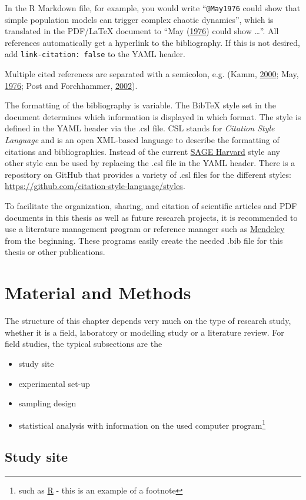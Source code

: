 \documentclass[a4paper,12pt]{article}
\providecommand{\tightlist}{%
  \setlength{\itemsep}{0pt}\setlength{\parskip}{0pt}}
\begin{document}
In the R Markdown file, for example, you would write \enquote{\texttt{@May1976} could show that simple population models can trigger complex chaotic dynamics}, which is translated in the PDF/LaTeX document to \enquote{May (\protect\hyperlink{ref-May1976}{1976}) could show \ldots{}}. All references automatically get a hyperlink to the bibliography. If this is not desired, add \texttt{link-citation:\ false} to the YAML header.

Multiple cited references are separated with a semicolon, e.g. (Kamm, \protect\hyperlink{ref-kamm2000}{2000}; May, \protect\hyperlink{ref-May1976}{1976}; Post and Forchhammer, \protect\hyperlink{ref-RN410}{2002}).

The formatting of the bibliography is variable. The BibTeX style set in the document determines which information is displayed in which format. The style is defined in the YAML header via the .csl file. CSL stands for \emph{Citation Style Language} and is an open XML-based language to describe the formatting of citations and bibliographies. Instead of the current \href{https://uk.sagepub.com/sites/default/files/sage_harvard_reference_style_0.pdf}{SAGE Harvard} style any other style can be used by replacing the .csl file in the YAML header. There is a repository on GitHub that provides a variety of .csl files for the different styles: \url{https://github.com/citation-style-language/styles}.

To facilitate the organization, sharing, and citation of scientific articles and PDF documents in this thesis as well as future research projects, it is recommended to use a literature management program or reference manager such as \href{https://www.mendeley.com/?interaction_required=true}{Mendeley} from the beginning. These programs easily create the needed .bib file for this thesis or other publications.

\newpage

\hypertarget{material-and-methods}{%
\section{Material and Methods}\label{material-and-methods}}

The structure of this chapter depends very much on the type of research study, whether it is a field, laboratory or modelling study or a literature review. For field studies, the typical subsections are the
\begin{itemize}
\tightlist
\item
  study site
\item
  experimental set-up
\item
  sampling design
\item
  statistical analysis with information on the used computer program\footnote{such as \href{https://cran.r-project.org/}{R} - this is an example of a footnote}
\end{itemize}
\hypertarget{study-site}{%
\subsection{Study site}\label{study-site}}
\end{document}
